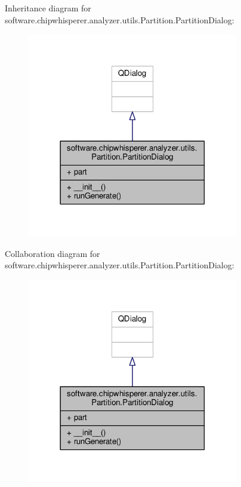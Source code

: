 Inheritance diagram for software.\+chipwhisperer.\+analyzer.\+utils.\+Partition.\+Partition\+Dialog\+:\nopagebreak
\begin{figure}[H]
\begin{center}
\leavevmode
\includegraphics[width=261pt]{dd/dba/classsoftware_1_1chipwhisperer_1_1analyzer_1_1utils_1_1Partition_1_1PartitionDialog__inherit__graph}
\end{center}
\end{figure}


Collaboration diagram for software.\+chipwhisperer.\+analyzer.\+utils.\+Partition.\+Partition\+Dialog\+:\nopagebreak
\begin{figure}[H]
\begin{center}
\leavevmode
\includegraphics[width=261pt]{dd/dd4/classsoftware_1_1chipwhisperer_1_1analyzer_1_1utils_1_1Partition_1_1PartitionDialog__coll__graph}
\end{center}
\end{figure}



